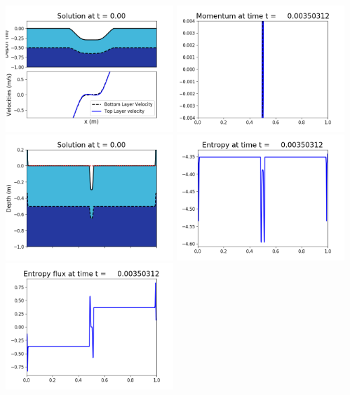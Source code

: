 \documentclass[11pt]{article}
\begin{document}
\includegraphics[width=0.475\textwidth]{frame0009fig1002.png}
\vskip 10pt 
\includegraphics[width=0.475\textwidth]{frame0009fig1003.png}
\includegraphics[width=0.475\textwidth]{frame0009fig1006.png}
\vskip 10pt 
\includegraphics[width=0.475\textwidth]{frame0009fig1007.png}
\includegraphics[width=0.475\textwidth]{frame0009fig1008.png}
\end{document}
